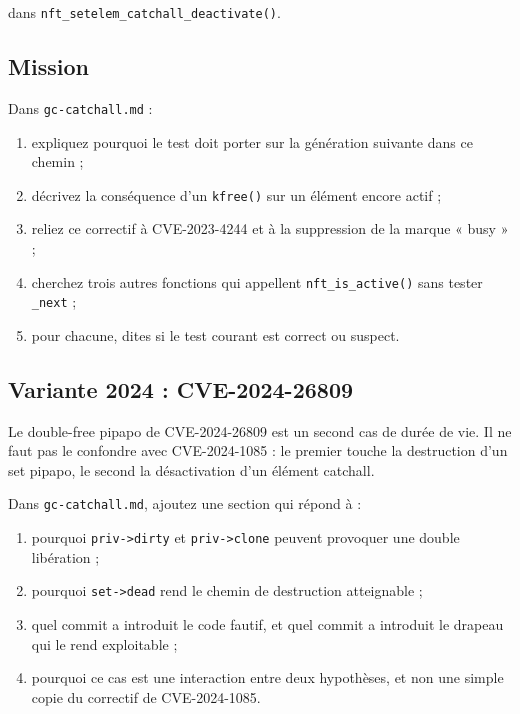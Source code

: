 \documentclass{training}
\begin{document}
dans \texttt{nft\_setelem\_catchall\_deactivate()}.

\subsection*{Mission}

Dans \texttt{gc-catchall.md} :

\begin{enumerate}
  \item expliquez pourquoi le test doit porter sur la génération suivante
        dans ce chemin ;
  \item décrivez la conséquence d'un \texttt{kfree()} sur un élément encore
        actif ;
  \item reliez ce correctif à CVE-2023-4244 et à la suppression de la
        marque « busy » ;
  \item cherchez trois autres fonctions qui appellent
        \texttt{nft\_is\_active()} sans tester \texttt{\_next} ;
  \item pour chacune, dites si le test courant est correct ou suspect.
\end{enumerate}

\subsection*{Variante 2024 : CVE-2024-26809}

Le double-free pipapo de CVE-2024-26809 est un second cas de durée de vie.
Il ne faut pas le confondre avec CVE-2024-1085 : le premier touche la
destruction d'un set pipapo, le second la désactivation d'un élément
catchall.

Dans \texttt{gc-catchall.md}, ajoutez une section qui répond à :

\begin{enumerate}
  \item pourquoi \texttt{priv->dirty} et \texttt{priv->clone} peuvent
        provoquer une double libération ;
  \item pourquoi \texttt{set->dead} rend le chemin de destruction
        atteignable ;
  \item quel commit a introduit le code fautif, et quel commit a introduit
        le drapeau qui le rend exploitable ;
  \item pourquoi ce cas est une interaction entre deux hypothèses, et non
        une simple copie du correctif de CVE-2024-1085.
\end{enumerate}
\end{document}
